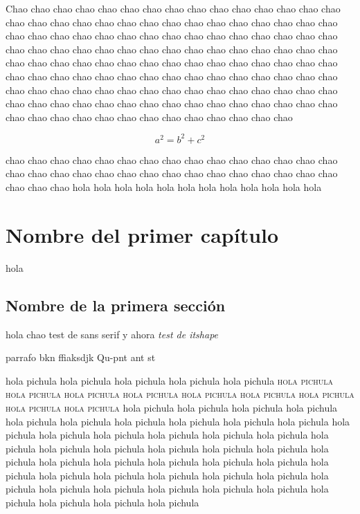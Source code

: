 \begin{slab}{Chao}
chao chao chao chao chao chao chao chao chao chao chao chao chao chao chao chao chao chao chao chao chao chao chao chao chao chao chao chao chao chao chao chao chao chao chao chao chao chao chao chao chao chao chao chao chao chao chao chao chao chao chao chao chao chao chao chao chao chao chao chao chao chao chao chao chao chao chao chao chao chao chao chao chao chao chao chao chao chao chao chao chao chao chao chao chao chao chao chao chao chao chao chao chao chao chao chao chao chao chao chao chao chao chao chao chao chao chao chao chao chao chao chao chao chao chao chao chao chao chao chao chao chao chao chao chao chao chao chao chao chao chao chao

\[
a^2=b^2+c^2
\]

chao chao chao chao chao chao chao chao chao chao chao chao chao chao chao chao chao chao chao chao chao chao chao chao chao chao chao chao chao chao chao chao chao
hola hola hola hola hola hola hola hola hola hola hola hola
\end{slab}

\chapter{Nombre del primer capítulo}

\thispagestyle{fancy}

hola

\section{Nombre de la primera sección}

hola chao {\sffamily test de sans serif} y ahora {\itshape test de itshape}

parrafo bkn ffiaksdjk Qu-pnt ant st

hola pichula hola pichula hola pichula hola pichula hola pichula \textsc{hola pichula hola pichula hola pichula hola pichula hola pichula hola pichula hola pichula hola pichula hola pichula} hola pichula hola pichula hola pichula hola pichula hola pichula hola pichula hola pichula hola pichula hola pichula hola pichula hola pichula hola pichula hola pichula hola pichula hola pichula hola pichula hola pichula hola pichula hola pichula hola pichula hola pichula hola pichula hola pichula hola pichula hola pichula hola pichula hola pichula hola pichula hola pichula hola pichula hola pichula hola pichula hola pichula hola pichula hola pichula hola pichula hola pichula hola pichula hola pichula hola pichula hola pichula hola pichula hola pichula hola pichula

